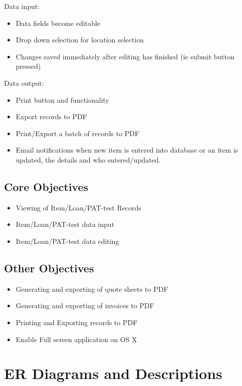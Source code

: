 \noindent Data input:
\begin{itemize}
    \item Data fields become editable
    \item Drop down selection for location selection
    \item Changes saved immediately after editing has finished (ie submit button pressed)
\end{itemize}

\noindent Data output:
\begin{itemize}
    \item Print button and functionality
    \item Export records to PDF
    \item Print/Export a batch of records to PDF
    \item Email notifications when new item is entered into database or an item is updated, the details and who entered/updated.
\end{itemize}


\subsection{Core Objectives}

\begin{itemize}
    \item Viewing of Item/Loan/PAT-test Records
    \item Item/Loan/PAT-test data input
    \item Item/Loan/PAT-test data editing
\end{itemize}

\subsection{Other Objectives}

\begin{itemize}
    \item Generating and exporting of quote sheets to PDF
    \item Generating and exporting of invoices to PDF
    \item Printing and Exporting records to PDF
    \item Enable Full screen application on OS X
\end{itemize}

\section{ER Diagrams and Descriptions}

